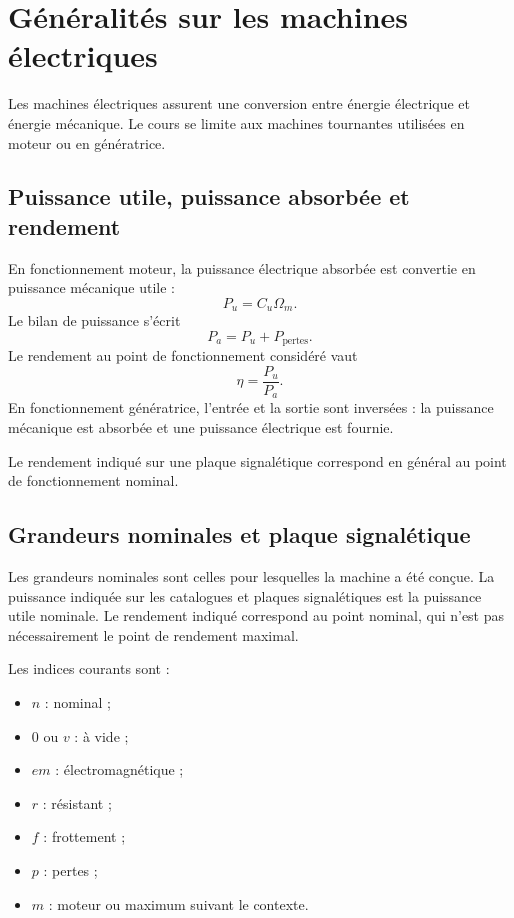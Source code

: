 
\section{Généralités sur les machines électriques}\label{sec:em-generalites}

Les machines électriques assurent une conversion entre énergie électrique et énergie mécanique. Le cours se limite aux machines tournantes utilisées en moteur ou en génératrice.

\TLChaineConversionElectromecanique

\subsection{Puissance utile, puissance absorbée et rendement}

En fonctionnement moteur, la puissance électrique absorbée est convertie en puissance mécanique utile :
\[
P_u=C_u\Omega_m.
\]
Le bilan de puissance s'écrit
\[
P_a=P_u+P_{\mathrm{pertes}}.
\]
Le rendement au point de fonctionnement considéré vaut
\[
\eta=\frac{P_u}{P_a}.
\]
En fonctionnement génératrice, l'entrée et la sortie sont inversées : la puissance mécanique est absorbée et une puissance électrique est fournie.

\TLBilanPuissancesMachine

Le rendement indiqué sur une plaque signalétique correspond en général au point de fonctionnement nominal.

\subsection{Grandeurs nominales et plaque signalétique}

Les grandeurs nominales sont celles pour lesquelles la machine a été conçue. La puissance indiquée sur les catalogues et plaques signalétiques est la puissance utile nominale. Le rendement indiqué correspond au point nominal, qui n'est pas nécessairement le point de rendement maximal.

Les indices courants sont :
\begin{itemize}
  \item $n$ : nominal ;
  \item $0$ ou $v$ : à vide ;
  \item $em$ : électromagnétique ;
  \item $r$ : résistant ;
  \item $f$ : frottement ;
  \item $p$ : pertes ;
  \item $m$ : moteur ou maximum suivant le contexte.
\end{itemize}

